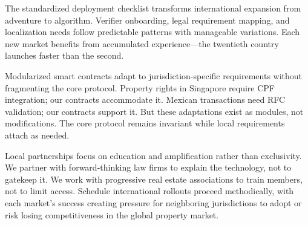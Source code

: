 The standardized deployment checklist transforms international expansion from adventure to algorithm. Verifier onboarding, legal requirement mapping, and localization needs follow predictable patterns with manageable variations. Each new market benefits from accumulated experience—the twentieth country launches faster than the second.

Modularized smart contracts adapt to jurisdiction-specific requirements without fragmenting the core protocol. Property rights in Singapore require CPF integration; our contracts accommodate it. Mexican transactions need RFC validation; our contracts support it. But these adaptations exist as modules, not modifications. The core protocol remains invariant while local requirements attach as needed.

Local partnerships focus on education and amplification rather than exclusivity. We partner with forward-thinking law firms to explain the technology, not to gatekeep it. We work with progressive real estate associations to train members, not to limit access. Schedule international rollouts proceed methodically, with each market's success creating pressure for neighboring jurisdictions to adopt or risk losing competitiveness in the global property market.